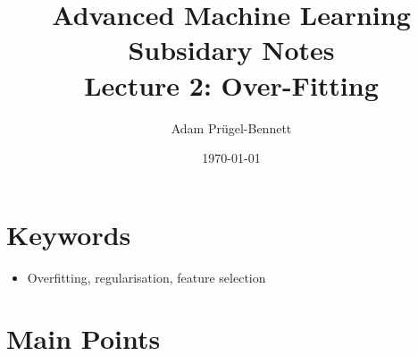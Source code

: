 \documentclass[11pt]{article}
\author{Adam Prügel-Bennett}
\date{\today}
\title{Advanced Machine Learning Subsidary Notes\\\medskip
\large Lecture 2: Over-Fitting}
\begin{document}
\maketitle


\section{Keywords}
\label{sec:org7878079}
\begin{itemize}
\item Overfitting, regularisation, feature selection
\end{itemize}

\section{Main Points}
\label{sec:org0fa874f}
\end{document}
